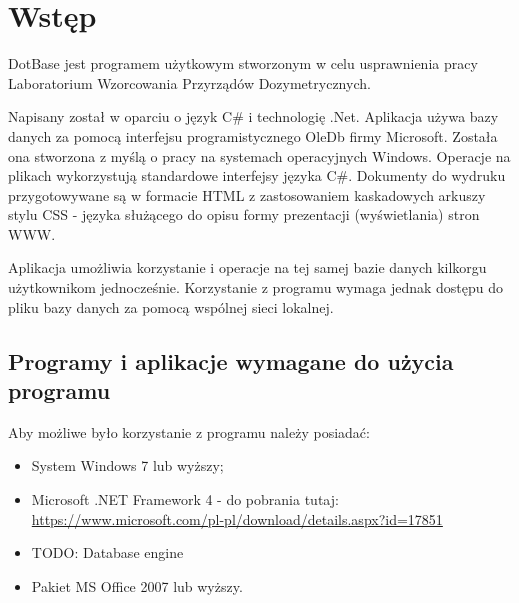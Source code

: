 
\rozdzial


\section{Wstęp}

DotBase jest programem użytkowym stworzonym w celu usprawnienia pracy Laboratorium Wzorcowania Przyrządów Dozymetrycznych.

Napisany został w oparciu o język C\# i technologię .Net. Aplikacja używa bazy danych za pomocą interfejsu programistycznego OleDb firmy Microsoft. Została ona stworzona z myślą o pracy na systemach operacyjnych Windows. Operacje na plikach wykorzystują standardowe interfejsy języka C\#. Dokumenty do wydruku przygotowywane są w formacie HTML z zastosowaniem kaskadowych arkuszy stylu CSS - języka służącego do opisu formy prezentacji (wyświetlania) stron WWW.

Aplikacja umożliwia korzystanie i operacje na tej samej bazie danych kilkorgu użytkownikom jednocześnie. Korzystanie z programu wymaga jednak dostępu do pliku bazy danych za pomocą wspólnej sieci lokalnej.

\subsection{Programy i aplikacje wymagane do użycia programu}

Aby możliwe było korzystanie z programu należy posiadać:
\begin{itemize}
	\item System Windows 7 lub wyższy;
	\item Microsoft .NET Framework 4 - do pobrania tutaj: \url{https://www.microsoft.com/pl-pl/download/details.aspx?id=17851}
	\item TODO: Database engine
	\item Pakiet MS Office 2007 lub wyższy.
\end{itemize}

